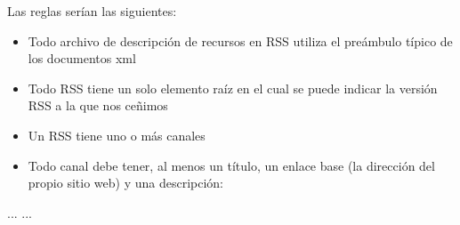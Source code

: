 \documentclass[letterpaper,10pt,spanish]{sphinxmanual}
\begin{document}
Las reglas serían las siguientes:
\begin{itemize}
\item {} 
Todo archivo de descripción de recursos en RSS utiliza el preámbulo típico de los documentos xml

\end{itemize}

\begin{sphinxVerbatim}[commandchars=\\\{\}]
\end{sphinxVerbatim}
\begin{itemize}
\item {} 
Todo RSS tiene un solo elemento raíz en el cual se puede indicar la versión RSS a la que nos ceñimos

\end{itemize}

\begin{sphinxVerbatim}[commandchars=\\\{\}]
 
\end{sphinxVerbatim}
\begin{itemize}
\item {} 
Un RSS tiene uno o más canales

\end{itemize}

\begin{sphinxVerbatim}[commandchars=\\\{\}]
\end{sphinxVerbatim}
\begin{itemize}
\item {} 
Todo canal debe tener, al menos un título, un enlace base (la dirección del propio sitio web) y una descripción:

\end{itemize}

\begin{sphinxVerbatim}[commandchars=\\\{\}]
                ...
                ...
\end{sphinxVerbatim}
\end{document}
